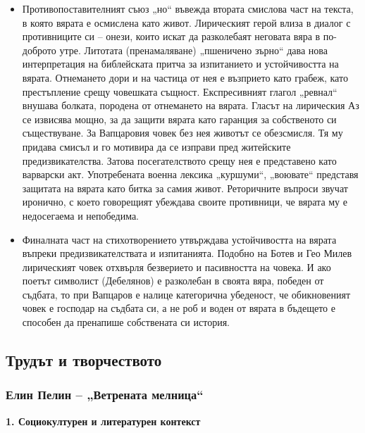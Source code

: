 \documentclass[12pt,a4paper]{article}
\begin{document}
\begin{itemize}[leftmargin=*]
\vspace{-0.6cm}
\item Противопоставителният съюз „но“ въвежда втората смислова част на текста, в която вярата е осмислена като живот. Лирическият герой влиза в диалог с противниците си – онези, които искат да разколебаят неговата вяра в по-доброто утре. Литотата (пренамаляване) „пшеничено зърно“ дава нова интерпретация на библейската притча за изпитанието и устойчивостта на вярата. Отнемането дори и на частица от нея е възприето като грабеж, като престъпление срещу човешката същност. Експресивният глагол „ревнал“ внушава болката, породена от отнемането на вярата. Гласът на лирическия Аз се извисява мощно, за да защити вярата като гаранция за собственото си съществуване. За Вапцаровия човек без нея животът се обезсмисля. Тя му придава смисъл и го мотивира да се изправи пред житейските предизвикателства. Затова посегателството срещу нея е представено като варварски акт. Употребената военна лексика „куршуми“, „воювате“ представя защитата на вярата като битка за самия живот. Реторичните въпроси звучат иронично, с което говорещият убеждава своите противници, че вярата му е недосегаема и непобедима. 
\end{itemize}

\begin{itemize}[leftmargin=*]
\vspace{-0.6cm}
\item Финалната част на стихотворението утвърждава устойчивостта на вярата въпреки предизвикателствата и изпитанията. Подобно на Ботев и Гео Милев лирическият човек отхвърля безверието и пасивността на човека. И ако поетът символист (Дебелянов) е разколебан в своята вяра, победен от съдбата, то при Вапцаров е налице категорична убеденост, че обикновеният човек е господар на съдбата си, а не роб и воден от вярата в бъдещето е способен да пренапише собствената си история.
\end{itemize}
\newpage

\subsection{Трудът и творчеството}
\subsubsection{\colorbox{green!40}{Елин Пелин – „Ветрената мелница“}}
\textbf{1. Социокултурен и литературен контекст}
\vspace{0.1cm}
 
\end{document}
